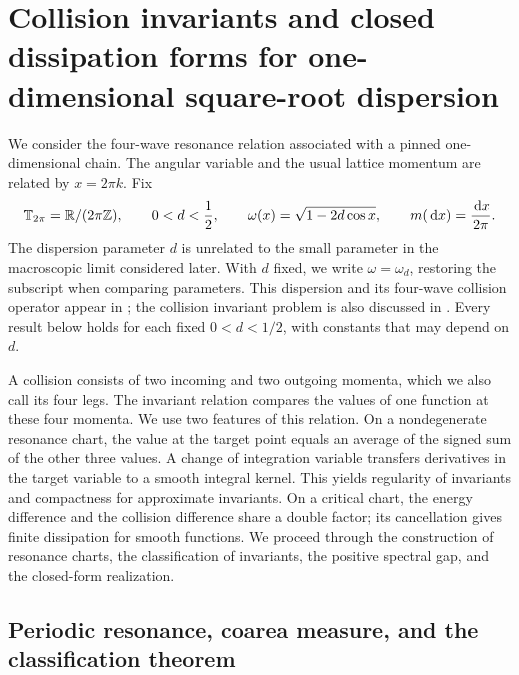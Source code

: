 \section{Collision invariants and closed dissipation forms for one-dimensional square-root dispersion}
\label{pin:section}

We consider the four-wave resonance relation associated with a pinned
one-dimensional chain. The angular variable and the usual lattice momentum
are related by $x=2\pi k$. Fix
\begin{equation}
 \mathbb T_{2\pi}=\mathbb R/(2\pi\mathbb Z),\qquad
 0<d<\frac12,\qquad
 \omega(x)=\sqrt{1-2d\cos x},\qquad
 m(\,\mathrm d x)=\frac{\,\mathrm d x}{2\pi}.
 \label{pin:dispersion}
\end{equation}
The dispersion parameter $d$ is unrelated to the small parameter in the
macroscopic limit considered later. With $d$ fixed, we write
$\omega=\omega_d$, restoring the subscript when comparing parameters.
This dispersion and its four-wave collision operator appear in
\cite{ALS2006,Luk2016}; the collision invariant problem is also discussed
in \cite{GLM2026}. Every result below holds for each fixed
$0<d<1/2$, with constants that may depend on $d$.

A collision consists of two incoming and two outgoing momenta, which we
also call its four legs. The invariant relation compares the values of
one function at these four momenta. We use two features of this relation.
On a nondegenerate resonance chart, the value at the target point equals
an average of the signed sum of the other three values. A change of
integration variable transfers derivatives in the target variable to a
smooth integral kernel. This yields regularity of invariants and
compactness for approximate invariants. On a critical chart, the energy
difference and the collision difference share a double factor; its
cancellation gives finite dissipation for smooth functions. We proceed
through the construction of resonance charts, the classification of
invariants, the positive spectral gap, and the closed-form realization.

\subsection{Periodic resonance, coarea measure, and the classification theorem}
\label{pin:model}

